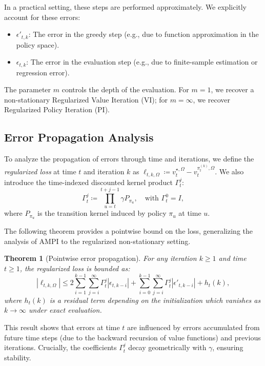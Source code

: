 \documentclass{article}
\theoremstyle{plain}
\newtheorem{theorem}{Theorem}[section]
\theoremstyle{definition}
\theoremstyle{remark}
\newcommand{\1}{\mathbbm{1}}
\begin{document}
In a practical setting, these steps are performed approximately. We explicitly account for these errors:
\begin{itemize}
    \item $\epsilon'_{t,k}$: The error in the greedy step (e.g., due to function approximation in the policy space).
    \item $\epsilon_{t,k}$: The error in the evaluation step (e.g., due to finite-sample estimation or regression error).
\end{itemize}
The parameter $m$ controls the depth of the evaluation. For $m=1$, we recover a non-stationary Regularized Value Iteration (VI); for $m=\infty$, we recover Regularized Policy Iteration (PI).

\subsection{Error Propagation Analysis}

To analyze the propagation of errors through time and iterations, we define the \textit{regularized loss} at time $t$ and iteration $k$ as $\ell_{t,k,\Omega} \coloneqq v_t^{\star, \Omega} - v_t^{\pi_t^{(k)}, \Omega}$.
We also introduce the time-indexed discounted kernel product $\Gamma_t^j$:
\begin{equation}
    \Gamma_t^j \coloneqq \prod_{u=t}^{t+j-1} \gamma P_{\pi_u}, \quad \text{with } \Gamma_t^0 = I,
\end{equation}
where $P_{\pi_u}$ is the transition kernel induced by policy $\pi_u$ at time $u$.

The following theorem provides a pointwise bound on the loss, generalizing the analysis of AMPI \cite{scherrer2015approximate} to the regularized non-stationary setting.

\begin{theorem}[Pointwise error propagation]
\label{thm:pointwise}
For any iteration $k \ge 1$ and time $t \ge 1$, the regularized loss is bounded as:
\begin{equation}
    |\ell_{t,k,\Omega}| \le 2 \sum_{i=1}^{k-1} \sum_{j=i}^\infty \Gamma_t^j |\epsilon_{t,k-i}| + \sum_{i=0}^{k-1} \sum_{j=i}^\infty \Gamma_t^j |\epsilon'_{t,k-i}| + h_t(k),
\end{equation}
where $h_t(k)$ is a residual term depending on the initialization which vanishes as $k \to \infty$ under exact evaluation.
\end{theorem}

This result shows that errors at time $t$ are influenced by errors accumulated from future time steps (due to the backward recursion of value functions) and previous iterations. Crucially, the coefficients $\Gamma_t^j$ decay geometrically with $\gamma$, ensuring stability.
\end{document}
